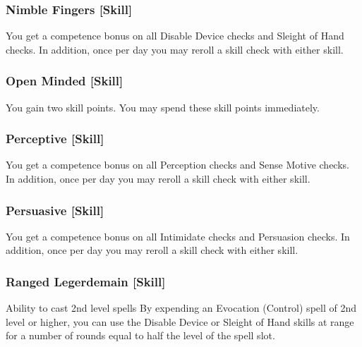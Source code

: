 \subsubsection{Nimble Fingers [Skill]}
 You get a  competence bonus on all Disable Device checks and Sleight of Hand checks. In addition, once per day you may reroll a skill check with either skill.

\subsubsection{Open Minded [Skill]}
 You gain two skill points. You may spend these skill points immediately.

\subsubsection{Perceptive [Skill]}
 You get a  competence bonus on all Perception checks and Sense Motive checks. In addition, once per day you may reroll a skill check with either skill.

\subsubsection{Persuasive [Skill]}
 You get a  competence bonus on all Intimidate checks and Persuasion checks. In addition, once per day you may reroll a skill check with either skill.

\subsubsection{Ranged Legerdemain [Skill]}
 Ability to cast 2nd level spells
 By expending an Evocation (Control) spell of 2nd level or higher, you can use the Disable Device or Sleight of Hand skills at \rngclose range for a number of rounds equal to half the level of the spell slot.

